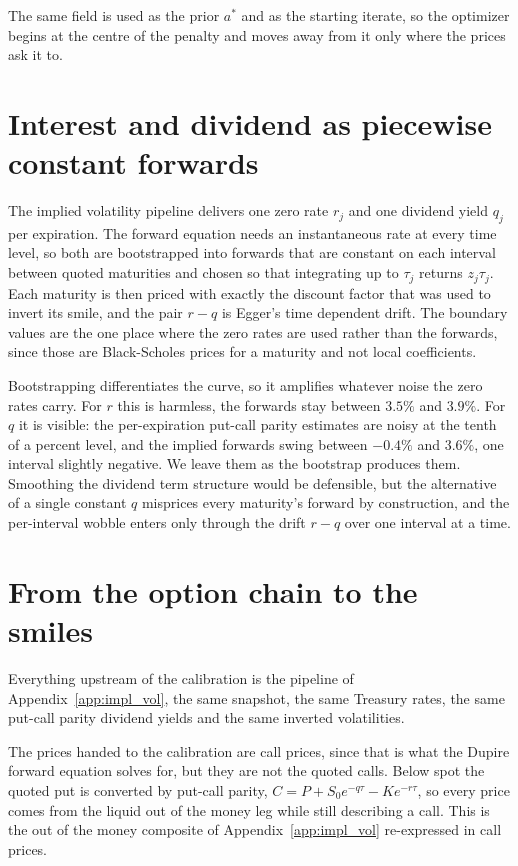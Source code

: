 The same field is used as the prior $a^*$ and as the starting iterate, so the optimizer begins
at the centre of the penalty and moves away from it only where the prices ask it to.

\section{Interest and dividend as piecewise constant forwards}
\label{subsec:term_structure_details}

The implied volatility pipeline delivers one zero rate $r_j$ and one dividend yield $q_j$ per
expiration. The forward equation needs an instantaneous rate at every time level, so both are
bootstrapped into forwards that are constant on each interval between quoted maturities and
chosen so that integrating up to $\tau_j$ returns $z_j\tau_j$. Each maturity is then priced
with exactly the discount factor that was used to invert its smile, and the pair $r - q$ is
Egger's time dependent drift. The boundary values are the one place where the zero rates are
used rather than the forwards, since those are Black-Scholes prices for a maturity and not
local coefficients.

Bootstrapping differentiates the curve, so it amplifies whatever noise the zero rates carry.
For $r$ this is harmless, the forwards stay between $3.5\%$ and $3.9\%$. For $q$ it is
visible: the per-expiration put-call parity estimates are noisy at the tenth of a percent
level, and the implied forwards swing between $-0.4\%$ and $3.6\%$, one interval slightly
negative. We leave them as the bootstrap produces them. Smoothing the dividend term structure
would be defensible, but the alternative of a single constant $q$ misprices every maturity's
forward by construction, and the per-interval wobble enters only through the drift $r - q$
over one interval at a time.

\section{From the option chain to the smiles}
\label{subsec:market_data_details}

Everything upstream of the calibration is the pipeline of Appendix~\ref{app:impl_vol}, the same
snapshot, the same Treasury rates, the same put-call parity dividend yields and the same
inverted volatilities.

The prices handed to the calibration are call prices, since that is what the Dupire forward
equation solves for, but they are not the quoted calls. Below spot the quoted put is converted
by put-call parity, $C = P + S_0e^{-q\tau} - Ke^{-r\tau}$, so every price comes from the liquid
out of the money leg while still describing a call. This is the out of the money composite of
Appendix~\ref{app:impl_vol} re-expressed in call prices.


